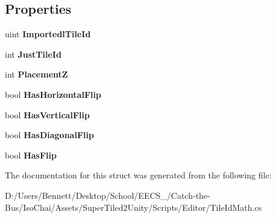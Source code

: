 \subsection*{Properties}
\begin{DoxyCompactItemize}
\item 
\mbox{\label{struct_super_tiled2_unity_1_1_editor_1_1_tile_id_math_a4d8492f43dee60a1d985657e44a444ab}} 
uint {\bfseries Importedl\+Tile\+Id}
\item 
\mbox{\label{struct_super_tiled2_unity_1_1_editor_1_1_tile_id_math_ae415234dc090e3c1c71fd7e1c3621043}} 
int {\bfseries Just\+Tile\+Id}
\item 
\mbox{\label{struct_super_tiled2_unity_1_1_editor_1_1_tile_id_math_a2f184eeeae9b669aeed92df9dc46e441}} 
int {\bfseries PlacementZ}
\item 
\mbox{\label{struct_super_tiled2_unity_1_1_editor_1_1_tile_id_math_a5e2be809f69157dc50824c3655461823}} 
bool {\bfseries Has\+Horizontal\+Flip}
\item 
\mbox{\label{struct_super_tiled2_unity_1_1_editor_1_1_tile_id_math_a2ec9a80e1edd6ffd1774e0e39fa1ab97}} 
bool {\bfseries Has\+Vertical\+Flip}
\item 
\mbox{\label{struct_super_tiled2_unity_1_1_editor_1_1_tile_id_math_aabf3d3b59f4178dbd4970d10c076a06c}} 
bool {\bfseries Has\+Diagonal\+Flip}
\item 
\mbox{\label{struct_super_tiled2_unity_1_1_editor_1_1_tile_id_math_a8846a777fb27967f4f74c55d3ca161d0}} 
bool {\bfseries Has\+Flip}
\end{DoxyCompactItemize}


The documentation for this struct was generated from the following file\+:\begin{DoxyCompactItemize}
\item 
D\+:/\+Users/\+Bennett/\+Desktop/\+School/\+E\+E\+C\+S\+\_/\+Catch-\/the-\/\+Bus/\+Iso\+Chai/\+Assets/\+Super\+Tiled2\+Unity/\+Scripts/\+Editor/Tile\+Id\+Math.\+cs\end{DoxyCompactItemize}
